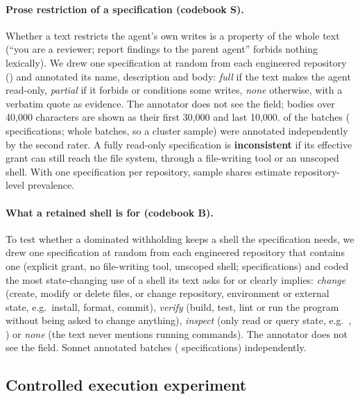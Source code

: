 \paragraph{Prose restriction of a specification (codebook S).} Whether a text restricts the agent's own writes is a
property of the whole text (``you are a reviewer; report findings to the parent agent'' forbids nothing lexically). We
drew one specification at random from each engineered repository (\nSpecSample{}) and
annotated its name, description and body: \emph{full} if the text makes the agent read-only, \emph{partial} if it
forbids or conditions some writes, \emph{none} otherwise, with a verbatim quote as evidence. The annotator does not see
the  field; bodies over 40{,}000 characters are shown as their first 30{,}000 and last 10{,}000. \nSpecReliabilityBatches{} of
the \nSpecBatches{} batches (\nSpecReliability{} specifications; whole batches, so a cluster sample) were annotated
independently by the second rater. A fully read-only
specification is \textbf{inconsistent} if its effective grant can still reach the file system, through a file-writing
tool or an unscoped shell. With one specification per repository, sample shares estimate repository-level prevalence.

\paragraph{What a retained shell is for (codebook B).} To test whether a dominated withholding keeps a shell the
specification needs, we drew one specification at random from each engineered repository that contains one (explicit
grant, no file-writing tool, unscoped shell; \nShellSample{} specifications) and coded the most state-changing use of a
shell its text asks for or clearly implies: \emph{change} (create, modify or delete files, or change repository,
environment or external state, e.g.\ install, format, commit), \emph{verify} (build, test, lint or run the program
without being asked to change anything), \emph{inspect} (only read or query state, e.g.\ , )
or \emph{none} (the text never mentions running commands). The annotator does not see the  field. Sonnet
annotated \nShellReliabilityBatches{} batches (\nShellReliability{} specifications) independently.


\subsection{Controlled execution experiment}
\label{sec:experiment}

